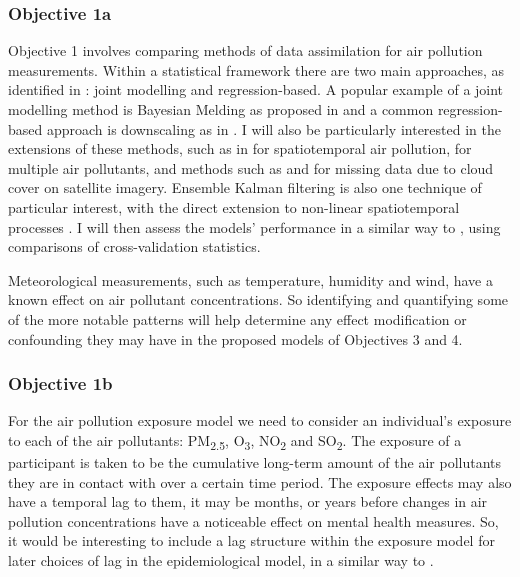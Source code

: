 \subsubsection{Objective 1a}
Objective 1 involves comparing methods of data assimilation for air pollution measurements. Within a statistical framework there are two main approaches, as identified in \citet[p.133-151]{Gelfand2019HandbookStatistics}: joint modelling and regression-based. A popular example of a joint modelling method is Bayesian Melding as proposed in \cite{Fuentes2005ModelModels} and a common regression-based approach is downscaling as in \cite{Berrocal2010AModels}. I will also be particularly interested in the extensions of these methods, such as in \cite{Choi2009Spatial-temporalMortality} for spatiotemporal air pollution, \cite{Berrocal2010AMisalignment} for multiple air pollutants, and methods such as \cite{Hoogh2019PredictingSwitzerland} and \cite{Harnisch2016ErrorSystem} for missing data due to cloud cover on satellite imagery. Ensemble Kalman filtering is also one technique of particular interest, with the direct extension to non-linear spatiotemporal processes \citep{Roth2017ThePerspective}. I  will then assess the models' performance in a similar way to \cite{Denby2008ComparisonScale}, using comparisons of cross-validation statistics.




Meteorological measurements, such as temperature, humidity and wind, have a known effect on air pollutant concentrations. So identifying and quantifying some of the more notable patterns will help determine any effect modification or confounding they may have in the proposed models of Objectives 3 and 4.

\subsubsection{Objective 1b}
For the air pollution exposure model we need to consider an individual's exposure to each of the air pollutants:  PM\textsubscript{2.5}, O\textsubscript{3}, NO\textsubscript{2} and SO\textsubscript{2}. The exposure of a participant is taken to be the cumulative long-term amount of the air pollutants they are in contact with over a certain time period. The exposure effects may also have a temporal lag to them, it may be months, or years before changes in air pollution concentrations have a noticeable effect on mental health measures. So, it would be interesting to include a lag structure within the exposure model for later choices of lag in the epidemiological model, in a similar way to \cite{Richardson2011HierarchicalAssociations}.

